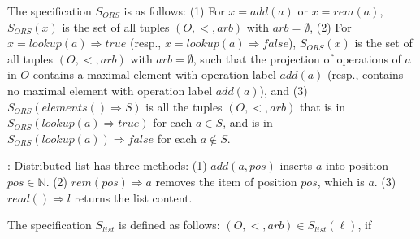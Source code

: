 
The specification $S_{\mathit{ORS}}$ is as follows: (1) For $x=add(a)$ or $x = rem(a)$, $S_{\mathit{ORS}}(x)$ is the set of all tuples $(O,<,arb)$ with $arb = \emptyset$, (2) For $x=lookup(a) \Rightarrow \mathit{true}$ (resp., $x=lookup(a) \Rightarrow \mathit{false}$), $S_{\mathit{ORS}}(x)$ is the set of all tuples $(O,<,arb)$ with $arb = \emptyset$, such that the projection of operations of $a$ in $O$ contains a maximal element with operation label $add(a)$ (resp., contains no maximal element with operation label $add(a)$), and (3) $S_{\mathit{ORS}}(elements() \Rightarrow S)$ is all the tuples $(O,<,arb)$ that is in $S_{\mathit{ORS}}(lookup(a) \Rightarrow \mathit{true})$ for each $a \in S$, and is in $S_{\mathit{ORS}}(lookup(a)) \Rightarrow \mathit{false}$ for each $a \notin S$.

: Distributed list has three methods: (1) $add(a,pos)$ inserts $a$ into position $pos \in \mathbb{N}$. (2) $rem(pos) \Rightarrow a$ removes the item of position $pos$, which is $a$. (3) $read() \Rightarrow l$ returns the list content.

The specification $S_{\mathit{list}}$ is defined as follows: $(O,<,arb) \in S_{\mathit{list}}(\ell)$, if

